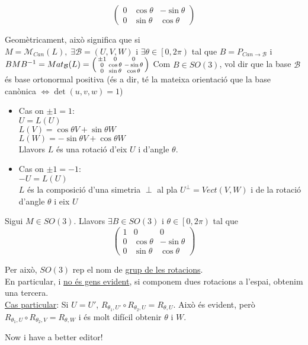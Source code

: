 \documentclass[../main.tex]{subfiles}
\begin{document}
\begin{itemize}
\begin{proposicio}
\begin{displaymath}
\begin{pmatrix}
                0 & \cos{\theta} & -\sin{\theta}\\
                0 & \sin{\theta} & \cos{\theta}
            \end{pmatrix}
        \end{displaymath}
    \end{proposicio}
    Geomètricament, això significa que si $M = \mathcal{M}_{\textit{Can}} (L),\; \exists \mathcal{B} = \left(U, V, W\right)\text{ i }\exists \theta \in \left[0, 2\pi\right)$
    tal que $B = P_{\textit{Can}\to\mathcal{B}}$ i $BMB^{-1} = Mat_\mathcal{B}(L) = \begin{psmallmatrix}
        \pm 1 & 0 & 0\\
        0 & \cos{\theta} & -\sin{\theta}\\
        0 & \sin{\theta} & \cos{\theta}
    \end{psmallmatrix}$
    Com $B \in SO(3)$, vol dir que la base $\mathcal{B}$ és base ortonormal positiva (és a dir, té
    la mateixa orientació que la base canònica $\Leftrightarrow \det{\left(u,v,w\right)} = 1$)
    \begin{itemize}
        \item Cas on $\pm 1 = 1$:\\
        $U = L(U)$\\
        $L(V) = \cos{\theta}V + \sin{\theta}W$\\
        $L(W) = -\sin{\theta}V + \cos{\theta}W$\\
        Llavors $L$ és una rotació d'eix $U$ i d'angle $\theta$.
        \item Cas on $\pm 1 = -1$:\\
        $-U = L(U)$\\
        $L$ és la composició d'una simetria $\perp$ al pla $U^\perp = Vect(V, W)$ i de la rotació
        d'angle $\theta$ i eix $U$
    \end{itemize}
    \begin{teorema}
        Sigui $M\in SO(3)$. Llavors $\exists B \in SO(3)$ i $\theta \in \left[0, 2\pi\right)$ tal que
        \begin{displaymath}
            \begin{pmatrix}
                1 & 0 & 0\\
                0 & \cos{\theta} & -\sin{\theta}\\
                0 & \sin{\theta} & \cos{\theta}
            \end{pmatrix}
        \end{displaymath}
    \end{teorema}
    Per això, $SO(3)$ rep el nom de \underline{grup de les rotacions}.\\
    En particular, i \underline{no és gens evident}, si componem dues rotacions a l'espai, obtenim
    una tercera.\\
    \underline{Cas particular}: Si $U = U'$, $R_{\theta_1,U'}\circ R_{\theta_2,U} = R_{\theta,U}$.
    Això és evident, però $R_{\theta_1,U}\circ R_{\theta_2,V} = R_{\theta,W}$ i és molt difícil
    obtenir $\theta$ i $W$.
\end{itemize}
Now i have a better editor!
\end{document}
